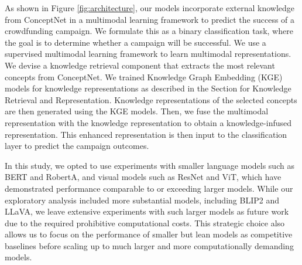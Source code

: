 
As shown in Figure \ref{fig:architecture}, our models incorporate external knowledge from ConceptNet in a multimodal learning framework to predict the success of a crowdfunding campaign. We formulate this as a binary classification task, where the goal is to determine whether a campaign will be successful. We use a supervised multimodal learning framework \cite{kiela2020supervised} to learn multimodal representations. We devise a knowledge retrieval component that extracts the most relevant concepts from ConceptNet. We trained Knowledge Graph Embedding (KGE) models for knowledge representations as described in the Section for Knowledge Retrieval and Representation. Knowledge representations of the selected concepts are then generated using the KGE models. Then, we fuse the multimodal representation with the knowledge representation to obtain a knowledge-infused representation. This enhanced representation is then input to the classification layer to predict the campaign outcomes. 

In this study, we opted to use experiments with smaller language models such as BERT and RobertA, and visual models such as ResNet and ViT, which have demonstrated performance comparable to or exceeding larger models. While our exploratory analysis included more substantial models, including BLIP2 and LLaVA, we leave extensive experiments with such larger models as future work due to the required prohibitive computational costs. This strategic choice also allows us to focus on the performance of smaller but lean models as competitive baselines before scaling up to much larger and more computationally demanding models.

